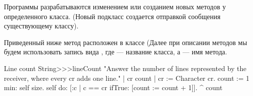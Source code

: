 \documentclass[a4paper,10pt,twoside]{book}
\begin{document}

Программы разрабатываются изменением или созданием новых методов у определенного класса.
(Новый подкласс создается отправкой сообщения существующему классу).


Приведенный ниже метод  расположен в классе 
(Далее при описании методов мы будем использовать запись вида ,
где  --- название класса, а  --- имя метода.

\begin{method}[lineCount]{Line count}
String>>>lineCount
   "Answer the number of lines represented by the receiver,
   where every cr adds one line."
   | cr count |
   cr := Character cr.
   count := 1 min: self size.
   self do:
      [:c | c == cr ifTrue: [count := count + 1]].
   ^ count
\end{method}

\end{document}
